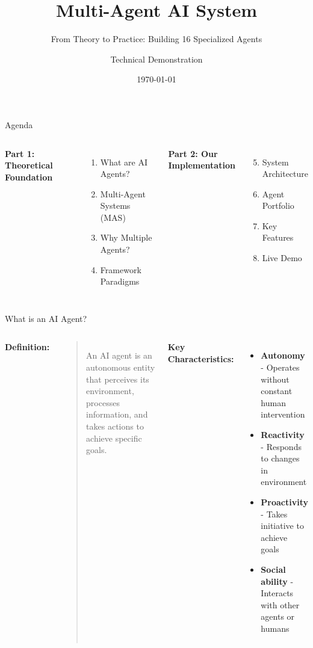 \documentclass[aspectratio=169,11pt]{beamer}
\title{\textbf{Multi-Agent AI System}}
\subtitle{From Theory to Practice: Building 16 Specialized Agents}
\author{Technical Demonstration}
\date{\today}
\begin{document}
\begin{frame}
\titlepage
\end{frame}

\begin{frame}{Agenda}
\begin{columns}
\textbf{Part 1: Theoretical Foundation}
\begin{enumerate}
    \item What are AI Agents?
    \item Multi-Agent Systems (MAS)
    \item Why Multiple Agents?
    \item Framework Paradigms
\end{enumerate}

\textbf{Part 2: Our Implementation}
\begin{enumerate}
    \setcounter{enumi}{4}
    \item System Architecture
    \item Agent Portfolio
    \item Key Features
    \item Live Demo
\end{enumerate}
\end{columns}
\end{frame}


\begin{frame}{What is an AI Agent?}
\begin{columns}
\textbf{Definition:}
\begin{quote}
An AI agent is an autonomous entity that perceives its environment, processes information, and takes actions to achieve specific goals.
\end{quote}

\vspace{0.3cm}

\textbf{Key Characteristics:}
\begin{itemize}
    \item \textbf{Autonomy} - Operates without constant human intervention
    \item \textbf{Reactivity} - Responds to changes in environment
    \item \textbf{Proactivity} - Takes initiative to achieve goals
    \item \textbf{Social ability} - Interacts with other agents or humans
\end{itemize}

\end{columns}
\end{frame}
\end{document}

